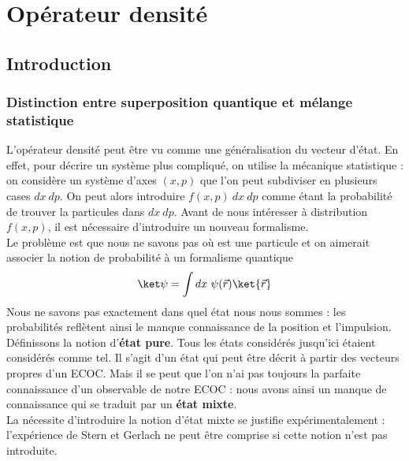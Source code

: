 \chapter{Opérateur densité}
\section{Introduction}
\subsection{Distinction entre superposition quantique et mélange statistique}
L'opérateur densité peut être vu comme une généralisation du vecteur d'état. 
En effet, pour décrire un système plus compliqué, on utilise la mécanique 
statistique : on considère un système d'axes $(x,p)$ que l'on peut subdiviser 
en plusieurs cases $dx\ dp$. On peut alors introduire $f(x,p)\ dx\ dp$ comme 
étant la probabilité de trouver la particules dans $dx\ dp$. Avant de nous 
intéresser à distribution $f(x,p)$, il est nécessaire d'introduire un nouveau 
formalisme.\\

Le problème est que nous ne savons pas où est une particule et on aimerait 
associer la notion de probabilité à un formalisme quantique
\begin{equation}
\ket\psi = \int dx\ \psi(\vec{r})\ket{\vec{r}}
\end{equation}
Nous ne savons pas exactement dans quel état nous nous sommes : les probabilités 
reflètent ainsi le manque connaissance de la position et l'impulsion.\\

Définissons la notion d'\textbf{état pure}. Tous les états considérés jusqu'ici 
étaient considérés comme tel. Il s'agit d'un état qui peut être décrit à partir 
des vecteurs propres d'un ECOC. Mais il se peut que l'on n'ai pas toujours la 
parfaite connaissance d'un observable de notre ECOC : nous avons ainsi 
un manque de connaissance qui se traduit par un \textbf{état mixte}. \\

La nécessite d'introduire la notion d'état mixte se justifie expérimentalement : 
l'expérience de Stern et Gerlach ne peut être comprise si cette notion n'est pas
introduite.

